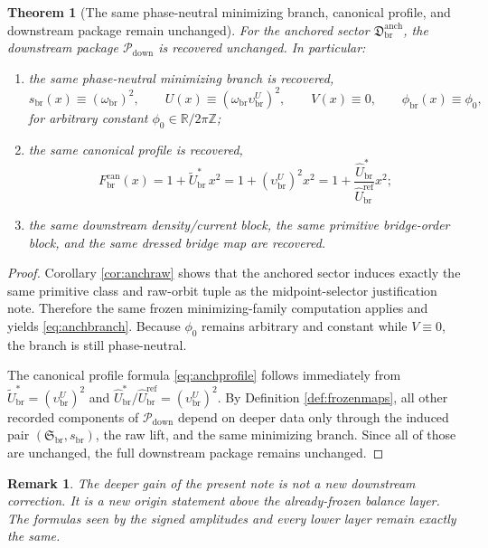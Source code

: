 \documentclass[11pt]{article}
\newcommand{\RespShapeEq}{\widetilde U_{\mathrm{br}}^{\ast}}
\newcommand{\RespRawRef}{\widehat U_{\mathrm{br}}^{\mathrm{ref}}}
\newcommand{\RespRawEq}{\widehat U_{\mathrm{br}}^{\ast}}
\newcommand{\RespVacPhase}{\phi_{\mathrm{br}}}
\newcommand{\CurvProfileCan}{F_{\mathrm{br}}^{\mathrm{can}}}
\newcommand{\DownPkg}{\mathscr P_{\mathrm{down}}}
\newcommand{\ShapeTuple}{\mathfrak S_{\mathrm{br}}}
\newcommand{\ScaleMod}{s_{\mathrm{br}}}
\newcommand{\AbsEqAmp}{\upsilon_{\mathrm{br}}^{U}}
\newcommand{\AbsScaleAmp}{\omega_{\mathrm{br}}}
\newcommand{\BalOriginSector}{\mathfrak D_{\mathrm{br}}^{\mathrm{anch}}}
\newtheorem{remark}{Remark}
\newtheorem{theorem}{Theorem}
\begin{document}
\begin{theorem}[The same phase-neutral minimizing branch, canonical profile, and downstream package remain unchanged]
\label{thm:anchdown}
For the anchored sector \(\BalOriginSector\), the downstream package \(\DownPkg\) is recovered unchanged. In particular:
\begin{enumerate}
    \item the same phase-neutral minimizing branch is recovered,
    \begin{equation}
    \ScaleMod(x)\equiv(\AbsScaleAmp)^{2},
    \qquad
    U(x)\equiv(\AbsScaleAmp\AbsEqAmp)^{2},
    \qquad
    V(x)\equiv0,
    \qquad
    \RespVacPhase(x)\equiv\phi_{0},
    \label{eq:anchbranch}
    \end{equation}
    for arbitrary constant \(\phi_{0}\in\mathbb R/2\pi\mathbb Z\);
    \item the same canonical profile is recovered,
    \begin{equation}
    \CurvProfileCan(x)
    =
    1+\RespShapeEq\,x^{2}
    =
    1+(\AbsEqAmp)^{2}x^{2}
    =
    1+\frac{\RespRawEq}{\RespRawRef}x^{2};
    \label{eq:anchprofile}
    \end{equation}
    \item the same downstream density/current block, the same primitive bridge-order block, and the same dressed bridge map are recovered.
\end{enumerate}
\end{theorem}

\begin{proof}
Corollary \ref{cor:anchraw} shows that the anchored sector induces exactly the same primitive class and raw-orbit tuple as the midpoint-selector justification note. Therefore the same frozen minimizing-family computation applies and yields \eqref{eq:anchbranch}. Because \(\phi_{0}\) remains arbitrary and constant while \(V\equiv0\), the branch is still phase-neutral.

The canonical profile formula \eqref{eq:anchprofile} follows immediately from \(\RespShapeEq=(\AbsEqAmp)^{2}\) and \(\RespRawEq/\RespRawRef=(\AbsEqAmp)^{2}\). By Definition \ref{def:frozenmaps}, all other recorded components of \(\DownPkg\) depend on deeper data only through the induced pair \((\ShapeTuple,\ScaleMod)\), the raw lift, and the same minimizing branch. Since all of those are unchanged, the full downstream package remains unchanged.
\end{proof}

\begin{remark}
The deeper gain of the present note is not a new downstream correction. It is a new origin statement above the already-frozen balance layer. The formulas seen by the signed amplitudes and every lower layer remain exactly the same.
\end{remark}
\end{document}
